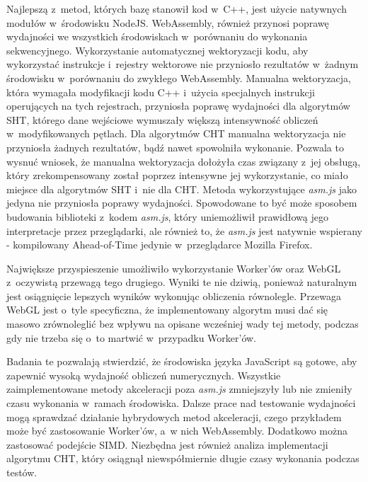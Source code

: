 Najlepszą z~metod, których bazę stanowił kod w~C++, jest użycie natywnych modułów w~środowisku NodeJS. WebAssembly, również przynosi poprawę wydajności we wszystkich środowiskach w~porównaniu do wykonania sekwencyjnego. Wykorzystanie automatycznej wektoryzacji kodu, aby wykorzystać instrukcje i~rejestry wektorowe nie przyniosło rezultatów w~żadnym środowisku w~porównaniu do zwykłego WebAssembly. Manualna wektoryzacja, która wymagała modyfikacji kodu C++ i~użycia specjalnych instrukcji operujących na tych rejestrach, przyniosła poprawę wydajności dla algorytmów SHT, którego dane wejściowe wymuszały większą intensywność obliczeń w~modyfikowanych pętlach. Dla algorytmów CHT manualna wektoryzacja nie przyniosła żadnych rezultatów, bądź nawet spowolniła wykonanie. Pozwala to wysnuć wniosek, że manualna wektoryzacja dołożyła czas związany z~jej obsługą, który zrekompensowany został poprzez intensywne jej wykorzystanie, co miało miejsce dla algorytmów SHT i~nie dla CHT. Metoda wykorzystujące \textit{asm.js} jako jedyna nie przyniosła poprawy wydajności. Spowodowane to być może sposobem budowania biblioteki z~kodem \textit{asm.js}, który uniemożliwił prawidłową jego interpretacje przez przeglądarki, ale również to, że \textit{asm.js} jest natywnie wspierany - kompilowany Ahead-of-Time jedynie w~przeglądarce Mozilla Firefox.

Największe przyspieszenie umożliwiło wykorzystanie Worker'ów oraz WebGL z~oczywistą przewagą tego drugiego. Wyniki te nie dziwią, ponieważ naturalnym jest osiągnięcie lepszych wyników wykonując obliczenia równolegle. Przewaga WebGL jest o~tyle specyficzna, że implementowany algorytm musi dać się masowo zrównoleglić bez wpływu na opisane wcześniej wady tej metody, podczas gdy nie trzeba się o~to martwić w~przypadku Worker'ów. 

Badania te pozwalają stwierdzić, że środowiska języka JavaScript są gotowe, aby zapewnić wysoką wydajność obliczeń numerycznych. Wszystkie zaimplementowane metody akceleracji poza \textit{asm.js} zmniejszyły lub nie zmieniły czasu wykonania w~ramach środowiska. Dalsze prace nad testowanie wydajności mogą sprawdzać działanie hybrydowych metod akceleracji, czego przykładem może być zastosowanie Worker'ów, a~w nich WebAssembly. Dodatkowo można zastosować podejście SIMD. Niezbędna jest również analiza implementacji algorytmu CHT, który osiągnął niewspółmiernie długie czasy wykonania podczas testów.

